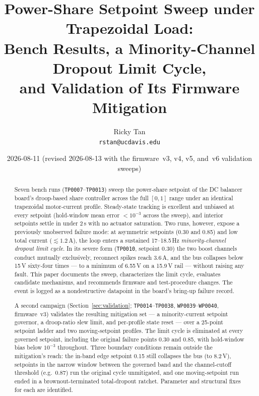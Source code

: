 \documentclass[11pt]{article}
\title{Power-Share Setpoint Sweep under Trapezoidal Load:\\
Bench Results, a Minority-Channel Dropout Limit Cycle,\\
and Validation of Its Firmware Mitigation}
\author{Ricky Tan\\ \small\texttt{rstan@ucdavis.edu}}
\date{2026-08-11 (revised 2026-08-13 with the firmware~v3, v4, v5, and~v6
validation sweeps)}
\newcommand{\code}[1]{\texttt{#1}}
\begin{document}
\maketitle

\begin{abstract}
Seven bench runs (\code{TP0007}--\code{TP0013}) sweep the power-share setpoint of the
DC balancer board's droop-based share controller across the full $[0,1]$ range under an
identical trapezoidal motor-current profile. Steady-state tracking is excellent and
unbiased at every setpoint (hold-window mean error $<10^{-3}$ across the sweep), and
interior setpoints settle in under 2\,s with no actuator saturation. Two runs, however,
expose a previously unobserved failure mode: at asymmetric setpoints (0.30 and 0.85)
and low total current ($\lesssim 1.2$\,A), the loop enters a sustained
17--18.5\,Hz \emph{minority-channel dropout limit cycle}. In its severe form
(\code{TP0010}, setpoint 0.30) the two boost channels conduct mutually exclusively,
reconnect spikes reach 3.6\,A, and the bus collapses below 15\,V sixty-four times ---
to a minimum of 6.55\,V on a 15.9\,V rail --- without raising any fault. This paper
documents the sweep, characterizes the limit cycle, evaluates candidate mechanisms,
and recommends firmware and test-procedure changes. The event is logged as a
nondestructive datapoint in the board's bring-up failure record.

A second campaign (Section~\ref{sec:validation}; \code{TP0014}--\code{TP0038},
\code{WP0039}--\code{WP0040}, firmware~v3) validates the resulting mitigation set ---
a minority-current setpoint governor, a droop-ratio slew limit, and per-profile state
reset --- over a 25-point setpoint ladder and two moving-setpoint profiles. The
limit cycle is eliminated at every governed setpoint, including the original failure
points 0.30 and 0.85, with hold-window bias below $10^{-3}$ throughout. Three
boundary conditions remain outside the mitigation's reach: the in-band edge setpoint
0.15 still collapses the bus (to 8.2\,V), setpoints in the narrow window between the
governed band and the channel-cutoff threshold (e.g.\ 0.87) run the original cycle
unmitigated, and one moving-setpoint run ended in a brownout-terminated total-dropout
ratchet. Parameter and structural fixes for each are identified.


\end{abstract}
\end{document}
